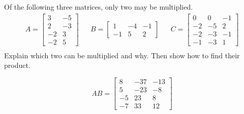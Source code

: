 
\begin{exerciseStatement}


Of the following three matrices, only two may be multiplied. 
\begin{align*} A= \left[\begin{array}{cc}
3 & -5 \\
2 & -3 \\
-2 & 3 \\
-2 & 5
\end{array}\right]  & & B= \left[\begin{array}{ccc}
1 & -4 & -1 \\
-1 & 5 & 2
\end{array}\right]  & & C= \left[\begin{array}{ccc}
0 & 0 & -1 \\
-2 & -5 & 2 \\
-2 & -3 & -1 \\
-1 & -3 & 1
\end{array}\right]  \\ \end{align*}
             Explain which two can be multiplied and why. Then show how to find their product.


\end{exerciseStatement}
    
\begin{exerciseAnswer} 
\[AB= \left[\begin{array}{ccc}
8 & -37 & -13 \\
5 & -23 & -8 \\
-5 & 23 & 8 \\
-7 & 33 & 12
\end{array}\right] \]
\end{exerciseAnswer}
    
